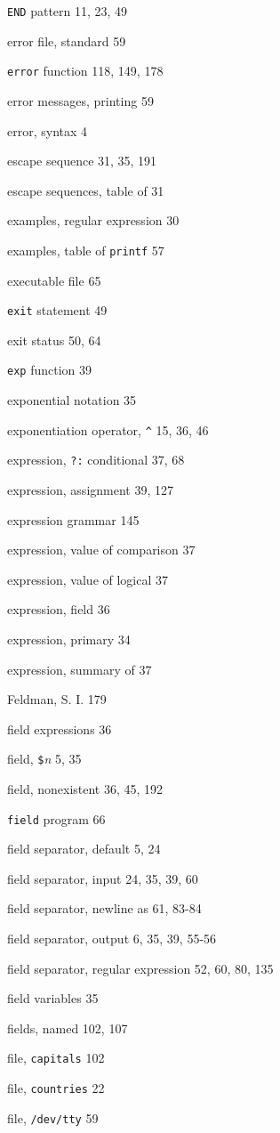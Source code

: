 \begin{multicols}{3}
\verb'END' pattern 11, 23, 49

error file, standard 59

\verb'error' function 118, 149, 178

error messages, printing 59

error, syntax 4

escape sequence 31, 35, 191

escape sequences, table of 31

examples, regular expression 30

examples, table of \verb'printf' 57

executable file 65

\verb'exit' statement 49

exit status 50, 64

\verb'exp' function 39

exponential notation 35

exponentiation operator, \verb'^' 15, 36, 46

expression, \verb'?:' conditional 37, 68

expression, assignment 39, 127

expression grammar 145

expression, value of comparison 37

expression, value of logical 37

expression, field 36

expression, primary 34

expression, summary of 37

Feldman, S. I. 179

field expressions 36

field, \verb'$'\textit{n} 5, 35

field, nonexistent 36, 45, 192

\verb'field' program 66

field separator, default 5, 24

field separator, input 24, 35, 39, 60

field separator, newline as 61, 83-84

field separator, output 6, 35, 39, 55-56

field separator, regular expression 52, 60, 80, 135

field variables 35

fields, named 102, 107

file, \verb'capitals' 102

file, \verb'countries' 22

file, \verb'/dev/tty' 59


\end{multicols}
